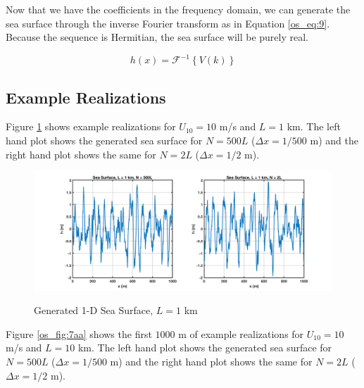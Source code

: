 Now that we have the coefficients in the frequency domain, we can generate the sea surface through the inverse Fourier transform as in Equation \ref{os_eq:9}. Because the sequence is Hermitian, the sea surface will be purely real.

\begin{equation}
  \label{os_eq:9}
  h(x) = \mathcal{F}^{-1}\left\{V(k) \right\}
  \end{equation}
\renewcommand{\baselinestretch}{2} \small\normalsize

\subsection {Example Realizations}
Figure \ref{os_fig:7a} shows example realizations for $U_{10} = 10$ m/s and $L = 1$ km. The left hand plot shows the generated sea surface for $N = 500L$ ($\Delta x = 1/500$ m) and the right hand plot shows the same for $N=2L$ ($\Delta x = 1/2$ m).

\begin{figure}[ht]
  \begin{center}
\includegraphics[width=6in]{../media/Ocean_Surface/sea_surface_1000.png}
  \end{center}
  \renewcommand{\baselinestretch}{1} \small\normalsize
  \begin{quote}
    \caption[Generated 1-D Sea Surface, $L = 1$ km]{Generated 1-D Sea Surface, $L = 1$ km\label{os_fig:7a}}
  \end{quote}
\end{figure}
\renewcommand{\baselinestretch}{2} \small\normalsize

Figure \ref{os_fig:7aa} shows the first $1000$ m of example realizations for $U_{10} = 10$ m/s and $L = 10$ km. The left hand plot shows the generated sea surface for $N = 500L$ ($\Delta x = 1/500$ m) and the right hand plot shows the same for $N=2L$ ($\Delta x = 1/2$ m).

